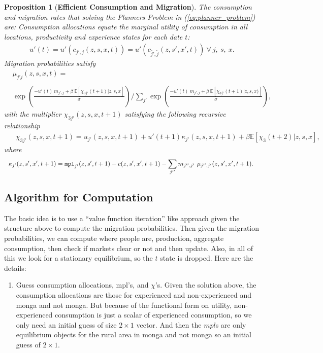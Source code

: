 \documentclass[12pt,pdftex]{article}
\newtheorem{proposition}{Proposition}
\begin{document}
\begin{onehalfspacing}
\begin{proposition}[\textbf{Efficient Consumption and Migration}] \label{apx-prp:efficient} The consumption and migration rates that solving the Planners Problem in (\ref{eq:planner_problem}) are: Consumption allocations equate the marginal utility of consumption in all locations, productivity and experience states for each date $t$:
{\small
\begin{align}
u'(t) = u'(c_{j',j}(z, s, x, t)) = u'(c_{\tilde{j'},\tilde{j}}(z, s', x', t)) \ \forall \ j, \ s, \ x.
\label{eq:foc_planner2}
\end{align}
}
Migration probabilities satisfy
{\footnotesize
\begin{align}
& \mu_{j'j}(z,s,x,t)  = \nonumber \\
\nonumber \\
& \exp \left(\frac{- u'(t) \ m_{j',j} + \beta \ \mathbb{E}\left[\chi_{3j'}(t+1)| z,s,x\right]}{\sigma} \right)  \Bigg / \sum_{j'} \exp \left( \frac{- u'(t)\ m_{j',j} + \beta \  \mathbb{E}\left[\chi_{3j'}(t+1)|z,s,x ) \right]}{\sigma} \right), \label{eq:migration_prob}
\end{align}
}
with the multiplier $\chi_{3j'}(z, s, x, t+1)$ satisfying the following recursive relationship
{\small
\begin{align}
& \ \ \chi_{3j'}(z, s, x, t+1) =  u_{j'}(z, s, x, t+1) +  u'(t+1) \kappa_{j'}(z, s,x,t+1) + \beta \mathbb{E}\left[\chi_{3}(t+2)|z, s, x  \right], \label{eq:dynamic_multiplier}
\end{align}}
where
{\small
\begin{align}
& \ \ \kappa_{j'}(z, s',x',t+1) = \mbox{\texttt{mpl}}_{j'}(z,s',t+1) - c(z, s',x',t+1) - \sum_{j''}  m_{j'',j'} \ \mu_{j'',j'}(z, s', x', t+1). \label{eq:kappa}
\end{align}}
\end{proposition}


\subsection{Algorithm for Computation}

The basic idea is to use a ``value function iteration'' like approach given the structure above to compute the migration probabilities. Then given the migration probabilities, we can compute where people are, production, aggregate consumption, then check if markets clear or not and then update. Also, in all of this we look for a stationary equilibrium, so the $t$ state is dropped. Here are the details:
\begin{enumerate}
\item Guess consumption allocations, mpl's, and $\chi$'s. Given the solution above, the consumption allocations are those for experienced and non-experienced and monga and not monga. But because of the functional form on utility, non-experienced consumption is just a scalar of experienced consumption, so we only need an initial guess of size $2\times1$ vector. And then the $mpl$s are only equilibrium objects for the rural area in monga and not monga so an initial guess of $2\times1$.


\end{enumerate}
\end{onehalfspacing}
\end{document}

